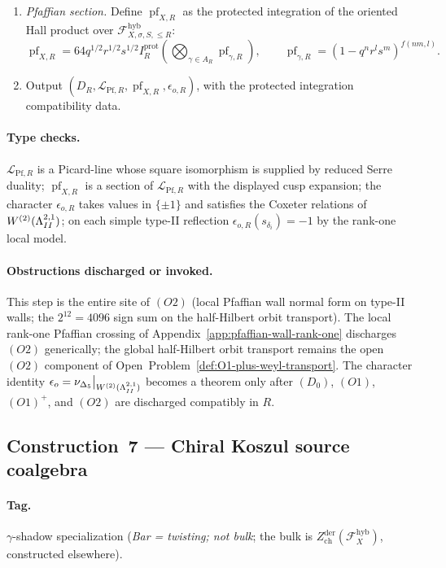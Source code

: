 \begin{enumerate}
\item \emph{Pfaffian section.}  Define
\(\operatorname{pf}_{X,R}\) as the protected integration of the
oriented Hall product over
\(\mathcal F_{X,\sigma,S,\le R}^{\mathrm{hyb}}\):
\[
\operatorname{pf}_{X,R}
=
64q^{1/2}r^{1/2}s^{1/2}
I_R^{\mathrm{prot}}\!\left(
\bigotimes_{\gamma\in A_R}\operatorname{pf}_{\gamma,R}\right),
\qquad
\operatorname{pf}_{\gamma,R}=(1-q^nr^ls^m)^{f(nm,l)}.
\]

\item Output
\((D_R,\mathscr L_{\mathrm{Pf},R},\operatorname{pf}_{X,R},
\epsilon_{o,R})\), with the protected integration compatibility data.
\end{enumerate}

\paragraph{Type checks.}
\(\mathscr L_{\mathrm{Pf},R}\) is a Picard-line whose square
isomorphism is supplied by reduced Serre duality;
\(\operatorname{pf}_{X,R}\) is a section of
\(\mathscr L_{\mathrm{Pf},R}\) with the displayed cusp expansion; the
character \(\epsilon_{o,R}\) takes values in \(\{\pm 1\}\) and
satisfies the Coxeter relations of
\(W^{(2)}(\Lambda^{2,1}_{II})\); on each simple type-II reflection
\(\epsilon_{o,R}(s_{\delta_i})=-1\) by the rank-one local model.

\paragraph{Obstructions discharged or invoked.}
This step is the entire site of \((O2)\) (local Pfaffian wall normal
form on type-II walls; the \(2^{12}=4096\) sign sum on the
half-Hilbert orbit transport).  The local rank-one Pfaffian crossing
of Appendix~\ref{app:pfaffian-wall-rank-one} discharges \((O2)\)
generically; the global half-Hilbert orbit transport remains the open
\((O2)\) component of
Open~Problem~\ref{def:O1-plus-weyl-transport}.  The character
identity
\(\epsilon_o=\nu_{\Delta_5}\big|_{W^{(2)}(\Lambda^{2,1}_{II})}\) becomes a
theorem only after \((D_0)\), \((O1)\), \((O1)^+\), and \((O2)\) are
discharged compatibly in \(R\).

\subsection{Construction~7 — Chiral Koszul source coalgebra}
\label{app:build-koszul}

\paragraph{Tag.} \(\gamma\)-shadow specialization
(\emph{Bar = twisting; not bulk}; the bulk is
\(Z^{\mathrm{der}}_{\mathrm{ch}}(\mathcal F_X^{\mathrm{hyb}})\),
constructed elsewhere).

